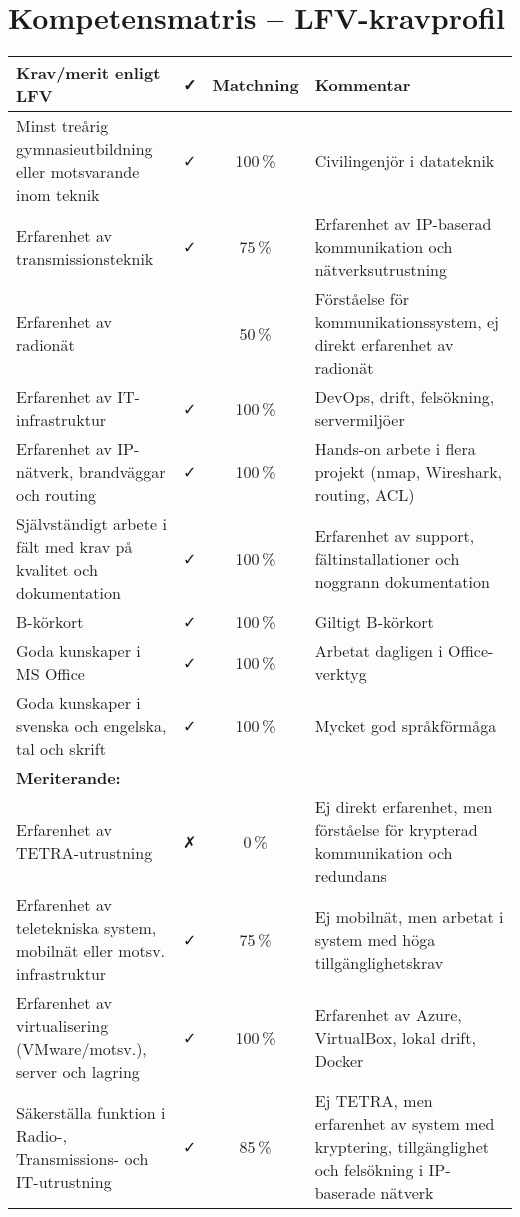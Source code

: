 \section*{Kompetensmatris – LFV-kravprofil}

\begin{tabular}{|p{9.5cm}|c|c|p{3cm}|}
\hline
\textbf{Krav/merit enligt LFV} & \textbf{✓} & \textbf{Matchning} & \textbf{Kommentar} \\
\hline
Minst treårig gymnasieutbildning eller motsvarande inom teknik & ✓ & 100 \% & Civilingenjör i datateknik \\
\hline
Erfarenhet av transmissionsteknik & ✓ & 75 \% & Erfarenhet av IP-baserad kommunikation och nätverksutrustning \\
\hline
Erfarenhet av radionät &  & 50 \% & Förståelse för kommunikationssystem, ej direkt erfarenhet av radionät \\
\hline
Erfarenhet av IT-infrastruktur & ✓ & 100 \% & DevOps, drift, felsökning, servermiljöer \\
\hline
Erfarenhet av IP-nätverk, brandväggar och routing & ✓ & 100 \% & Hands-on arbete i flera projekt (nmap, Wireshark, routing, ACL) \\
\hline
Självständigt arbete i fält med krav på kvalitet och dokumentation & ✓ & 100 \% & Erfarenhet av support, fältinstallationer och noggrann dokumentation \\
\hline
B-körkort & ✓ & 100 \% & Giltigt B-körkort \\
\hline
Goda kunskaper i MS Office & ✓ & 100 \% & Arbetat dagligen i Office-verktyg \\
\hline
Goda kunskaper i svenska och engelska, tal och skrift & ✓ & 100 \% & Mycket god språkförmåga \\
\hline
\textbf{Meriterande:} & & & \\
\hline
Erfarenhet av TETRA-utrustning & ✗ & 0 \% & Ej direkt erfarenhet, men förståelse för krypterad kommunikation och redundans \\
\hline
Erfarenhet av teletekniska system, mobilnät eller motsv. infrastruktur & ✓ & 75 \% & Ej mobilnät, men arbetat i system med höga tillgänglighetskrav \\
\hline
Erfarenhet av virtualisering (VMware/motsv.), server och lagring & ✓ & 100 \% & Erfarenhet av Azure, VirtualBox, lokal drift, Docker \\
\hline
Säkerställa funktion i Radio-, Transmissions- och IT-utrustning & ✓ & 85 \% & Ej TETRA, men erfarenhet av system med kryptering, tillgänglighet och felsökning i IP-baserade nätverk \\
\hline
\end{tabular}
